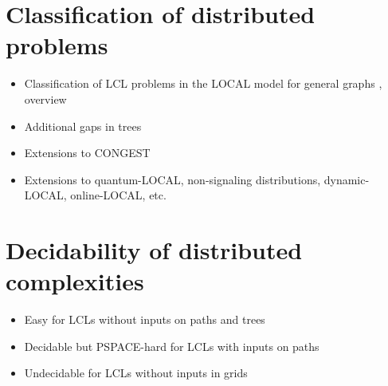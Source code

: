 \documentclass[a4paper,11pt]{article}
\begin{document}
\section{Classification of distributed problems}
\begin{itemize}
    \item Classification of LCL problems in the LOCAL model for general graphs \cite{
        cole-vishkin-1986-deterministic-coin-tossing-with,
        naor-1991-a-lower-bound-on-probabilistic-algorithms-for,
        linial-1992-locality-in-distributed-graph-algorithms,
        naor-stockmeyer-1995-what-can-be-computed-locally,
        brandt-fischer-etal-2016-a-lower-bound-for-the,
        fischer-ghaffari-2017-sublogarithmic-distributed,
        ghaffari-harris-kuhn-2018-on-derandomizing-local,
        balliu-hirvonen-etal-2018-new-classes-of-distributed,
        chang-pettie-2019-a-time-hierarchy-theorem-for-the,
        chang-kopelowitz-pettie-2019-an-exponential-separation,
        rozhon-ghaffari-2020-polylogarithmic-time-deterministic,
        balliu-brandt-etal-2020-how-much-does-randomness-help,
        balliu-brandt-etal-2021-almost-global-problems-in-the
    }, overview \cite{suomela-2020-landscape-of-locality-invited-talk}
    \item Additional gaps in trees \cite{
        chang-2020-the-complexity-landscape-of-distributed,
        balliu-brandt-etal-2021-almost-global-problems-in-the,grunau-rozhon-brandt-2022-the-landscape-of-distributed
    }
    \item Extensions to CONGEST \cite{
        balliu-censor-hillel-etal-2021-locally-checkable
    }
    \item Extensions to quantum-LOCAL, non-signaling distributions, dynamic-LOCAL, online-LOCAL, etc. \cite{
        akbari-eslami-etal-2023-locality-in-online-dynamic,
        dhar-kujawa-etal-2024-local-problems-in-trees-across-a,
        akbari-coiteux-roy-etal-2025-online-locality-meets
    }
\end{itemize}

\section{Decidability of distributed complexities}
\begin{itemize}
    \item Easy for LCLs without inputs on paths \cite{chang-studeny-suomela-2023-distributed-graph-problems,brandt-hirvonen-etal-2017-lcl-problems-on-grids} and trees \cite{balliu-brandt-etal-2022-efficient-classification-of}
    \item Decidable but PSPACE-hard for LCLs with inputs on paths \cite{balliu-brandt-etal-2019-the-distributed-complexity-of}
    \item Undecidable for LCLs without inputs in grids \cite{naor-stockmeyer-1995-what-can-be-computed-locally,brandt-hirvonen-etal-2017-lcl-problems-on-grids}
\end{itemize}
\end{document}
